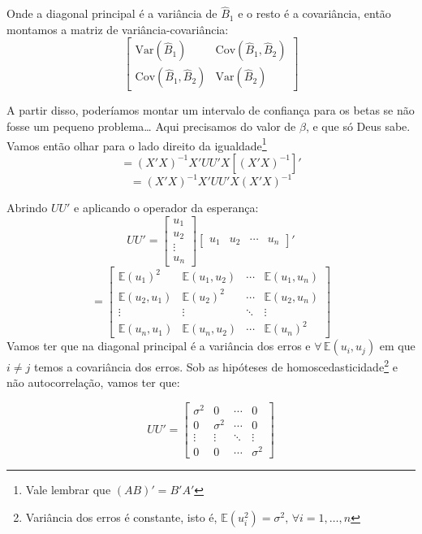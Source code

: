 \documentclass[
  letterpaper,
  DIV=11,
  numbers=noendperiod]{scrreprt}
\theoremstyle{definition}
\theoremstyle{plain}
\theoremstyle{remark}
\begin{document}
Onde a diagonal principal é a variância de \(\hat{B}_{1}\) e o resto é a
covariância, então montamos a matriz de variância-covariância: \[
\begin{bmatrix}
\text{Var}(\hat{B}_{1}) & \text{Cov}(\hat{B}_{1}, \hat{B}_{2}) \\
\text{Cov}(\hat{B}_{1}, \hat{B}_{2}) & \text{Var}(\hat{B}_{2})
\end{bmatrix}
\]

A partir disso, poderíamos montar um intervalo de confiança para os
betas se não fosse um pequeno problema\ldots{} Aqui precisamos do valor
de \(\beta\), e que só Deus sabe. Vamos então olhar para o lado direito
da igualdade\footnote{Vale lembrar que \((AB)' = B' A'\)} \[
=(X' X)^{-1} X' UU' X[(X' X)^{-1}]'
\] \[
=(X' X)^{-1} X' UU' X(X' X)^{-1}
\]

Abrindo \(UU'\) e aplicando o operador da esperança: \[
UU' =
\begin{bmatrix}
u_1 \\
u_2 \\
\vdots \\
u_n
\end{bmatrix}
\begin{bmatrix}
u_1 & u_2 & \cdots & u_n
\end{bmatrix}'
\] \[
=
\begin{bmatrix}
\mathbb{E}(u_1)^{2} & \mathbb{E}(u_1, u_2) & \cdots & \mathbb{E}(u_1, u_n) \\
\mathbb{E}(u_2, u_1) & \mathbb{E}(u_2)^{2} & \cdots & \mathbb{E}(u_2, u_n) \\
\vdots & \vdots & \ddots & \vdots \\
\mathbb{E}(u_n, u_1) & \mathbb{E}(u_n, u_2) & \cdots & \mathbb{E}(u_n)^{2}
\end{bmatrix}
\] Vamos ter que na diagonal principal é a variância dos erros e
\(\forall \, \mathbb{E}(u_{i}, u_{j})\) em que \(i \neq j\) temos a
covariância dos erros. Sob as hipóteses de homoscedasticidade\footnote{Variância
  dos erros é constante, isto é,
  \(\mathbb{E}(u_i^2) = \sigma^2, \, \forall i=1, \ldots, n\)} e não
autocorrelação, vamos ter que:

\[
UU' = \begin{bmatrix}
\sigma^{2} & 0 & \cdots & 0 \\
0 & \sigma^{2} & \cdots & 0 \\
\vdots & \vdots & \ddots & \vdots \\
0 & 0 & \cdots & \sigma^{2}
\end{bmatrix}
\]
\end{document}

